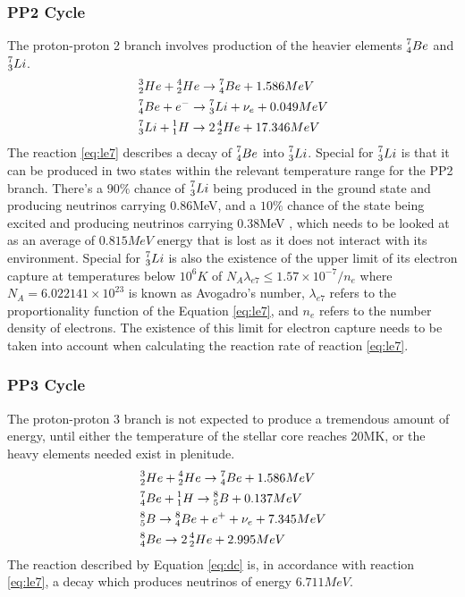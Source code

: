 \documentclass[10pt, nofootinbib, twocolumn]{revtex4-1}
\begin{document}
\subsubsection{PP2 Cycle}
The proton-proton 2 branch involves production of the heavier elements $\prescript{7}{4}Be$ and $\prescript{7}{3}Li$. 
\begin{align}
    & \prescript{3}{2}He+\prescript{4}{2}He\rightarrow\prescript{7}{4}Be+1.586MeV \label{eq:r34}\\
    & \prescript{7}{4}Be+e^-\rightarrow \prescript{7}{3}Li+\nu_e+0.049MeV \label{eq:le7}\\
    & \prescript{7}{3}Li+\prescript{1}{1}H \rightarrow 2\prescript{4}{2}He+17.346MeV \label{eq:l17l}
\end{align}
The reaction \eqref{eq:le7} describes a decay of $\prescript{7}{4}Be$ into $\prescript{7}{3}Li$. Special for $\prescript{7}{3}Li$ is that it can be produced in two states within the relevant temperature range for the PP2 branch. There's a $90\%$ chance of $\prescript{7}{3}Li$ being produced in the ground state and producing neutrinos carrying 0.86MeV, and a $10\%$ chance of the state being excited and producing neutrinos carrying 0.38MeV \cite{ast}, which needs to be looked at as an average of $0.815MeV$ energy that is lost as it does not interact with its environment. Special for $\prescript{7}{3}Li$ is also the existence of the upper limit of its electron capture at temperatures below $10^6 K$ of $N_A \lambda_{e7} \leq 1.57 \times 10^{-7}/n_e$ where $N_A=6.022141\times10^{23}$ is known as Avogadro's number, $\lambda_{e7}$ refers to the proportionality function of the Equation \eqref{eq:le7}, and $n_e$ refers to the number density of electrons. The existence of this limit  for electron capture needs to be taken into account when calculating the reaction rate of reaction \eqref{eq:le7}.


\subsubsection{PP3 Cycle}
The proton-proton 3 branch is not expected to produce a tremendous amount of energy, until either the temperature of the stellar core reaches 20MK, or the heavy elements needed exist in plenitude.
\begin{align}
    & \prescript{3}{2}He+\prescript{4}{2}He\rightarrow\prescript{7}{4}Be+1.586MeV \label{eq:repeat}\\
    & \prescript{7}{4}Be+\prescript{1}{1}H \rightarrow \prescript{8}{5}B+0.137MeV \label{eq:l17}\\
    & \prescript{8}{5}B  \rightarrow \prescript{8}{4}Be+e^++\nu_e+7.345MeV \label{eq:dc}\\
    & \prescript{8}{4}Be \rightarrow 2\prescript{4}{2}He +2.995MeV\label{eq:grr}
\end{align}
The reaction described by Equation \eqref{eq:dc} is, in accordance with reaction \eqref{eq:le7}, a decay which produces neutrinos of energy $6.711MeV$.
\end{document}

